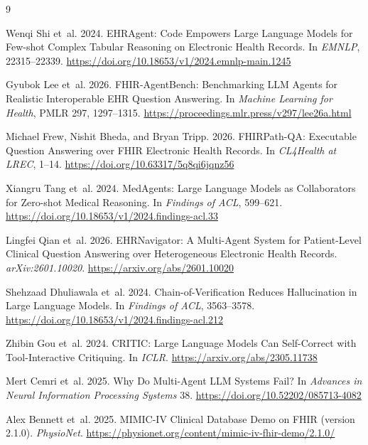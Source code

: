\documentclass[sigconf,nonacm]{acmart}
\begin{document}
\begin{thebibliography}{9}

Wenqi Shi et~al. 2024.
EHRAgent: Code Empowers Large Language Models for Few-shot Complex Tabular Reasoning on Electronic Health Records.
In \emph{EMNLP}, 22315--22339.
\url{https://doi.org/10.18653/v1/2024.emnlp-main.1245}

Gyubok Lee et~al. 2026.
FHIR-AgentBench: Benchmarking LLM Agents for Realistic Interoperable EHR Question Answering.
In \emph{Machine Learning for Health}, PMLR 297, 1297--1315.
\url{https://proceedings.mlr.press/v297/lee26a.html}

Michael Frew, Nishit Bheda, and Bryan Tripp. 2026.
FHIRPath-QA: Executable Question Answering over FHIR Electronic Health Records.
In \emph{CL4Health at LREC}, 1--14.
\url{https://doi.org/10.63317/5q8qi6jqnz56}

Xiangru Tang et~al. 2024.
MedAgents: Large Language Models as Collaborators for Zero-shot Medical Reasoning.
In \emph{Findings of ACL}, 599--621.
\url{https://doi.org/10.18653/v1/2024.findings-acl.33}

Lingfei Qian et~al. 2026.
EHRNavigator: A Multi-Agent System for Patient-Level Clinical Question Answering over Heterogeneous Electronic Health Records.
\emph{arXiv:2601.10020}.
\url{https://arxiv.org/abs/2601.10020}

Shehzaad Dhuliawala et~al. 2024.
Chain-of-Verification Reduces Hallucination in Large Language Models.
In \emph{Findings of ACL}, 3563--3578.
\url{https://doi.org/10.18653/v1/2024.findings-acl.212}

Zhibin Gou et~al. 2024.
CRITIC: Large Language Models Can Self-Correct with Tool-Interactive Critiquing.
In \emph{ICLR}.
\url{https://arxiv.org/abs/2305.11738}

Mert Cemri et~al. 2025.
Why Do Multi-Agent LLM Systems Fail?
In \emph{Advances in Neural Information Processing Systems} 38.
\url{https://doi.org/10.52202/085713-4082}

Alex Bennett et~al. 2025.
MIMIC-IV Clinical Database Demo on FHIR (version 2.1.0).
\emph{PhysioNet}.
\url{https://physionet.org/content/mimic-iv-fhir-demo/2.1.0/}

\end{thebibliography}
\end{document}

